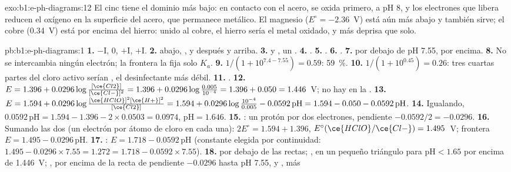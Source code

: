\begin{solution}{exo:b1:e-ph-diagrams:12}
El cinc tiene el dominio más bajo: en contacto con el acero, se oxida
primero,  a pH 8, y los electrones que
libera reducen el oxígeno en la superficie del acero, que permanece
metálico. El magnesio ($E^\circ = -2.36$~V) está aún más abajo y también
sirve; el cobre (0.34~V) está por encima del hierro: unido al cobre, el
hierro sería el metal oxidado, y más deprisa que solo.
\end{solution}

\begin{solution}{pb:b1:e-ph-diagrams:1}
\textbf{1.} $-$I, 0, $+$I, $+$I.
\textbf{2.}  abajo, , y después  y 
arriba.
\textbf{3.}  y , un .
\textbf{4.} .
\textbf{5.} .
\textbf{6.} .
\textbf{7.}  por debajo de pH 7.55,  por encima.
\textbf{8.} No se intercambia ningún electrón; la frontera la fija solo
$K_a$.
\textbf{9.} $1/(1 + 10^{7.4 - 7.55}) = 0.59$: \qty{59}{\percent}.
\textbf{10.} $1/(1 + 10^{0.45}) = 0.26$: tres cuartas partes del cloro
activo serían , el desinfectante más débil.
\textbf{11.} .
\textbf{12.} $E = 1.396 + 0.0296\log\frac{[\ce{Cl2}]}{[\ce{Cl-}]^2} = 1.396
+ 0.0296\log\frac{0.005}{10^{-4}} = 1.396 + 0.050 = 1.446$~V; no hay
 en la .
\textbf{13.} $E = 1.594 + 0.0296\log\frac{[\ce{HClO}]^2[\ce{H+}]^2}{[\ce{Cl2}]}
= 1.594 + 0.0296\log\frac{10^{-4}}{0.005} - 0.0592\,\mathrm{pH} = 1.594 -
0.050 - 0.0592\,\mathrm{pH}$.
\textbf{14.} Igualando, $0.0592\,\mathrm{pH} = 1.594 - 1.396 - 2 \times 0.0503
= 0.0974$, $\mathrm{pH} = 1.646$.
\textbf{15.} : un protón por dos
electrones, pendiente $-0.0592/2 = -0.0296$.
\textbf{16.} Sumando las dos  (un electrón por átomo de
cloro en cada una): $2E^\circ = 1.594 + 1.396$, $E^\circ(\ce{HClO}/\ce{Cl-}) =
1.495$~V; frontera $E = 1.495 - 0.0296\,\mathrm{pH}$.
\textbf{17.} : $E = 1.718 - 0.0592\,\mathrm{pH}$
(constante elegida por continuidad: $1.495 - 0.0296 \times 7.55 = 1.272 = 1.718
- 0.0592 \times 7.55$).
\textbf{18.}  por debajo de las rectas; , en un pequeño
triángulo para $\mathrm{pH} < 1.65$ por encima de 1.446~V; , por
encima de la recta de pendiente $-0.0296$ hasta pH 7.55, y , más

\end{solution}
